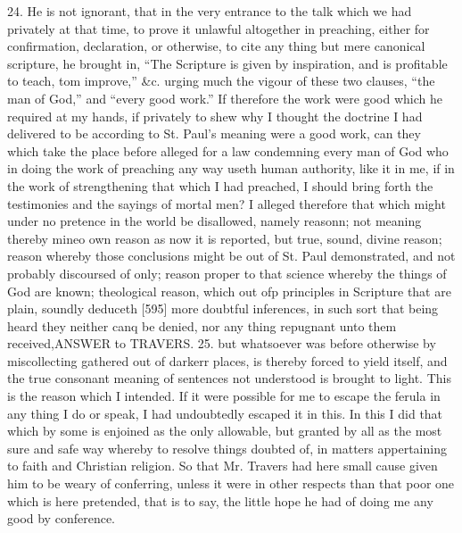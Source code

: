 24. He is not ignorant, that in the very entrance to the talk which we had privately at that time, to prove it unlawful altogether in preaching, either for confirmation, declaration, or otherwise, to cite any thing but mere canonical scripture, he brought in, “The Scripture is given by inspiration, and is profitable to teach, tom improve,” &c. urging much the vigour of these two clauses, “the man of God,” and “every good work.” If therefore the work were good which he required at my hands, if privately to shew why I thought the doctrine I had delivered to be according to St. Paul’s meaning were a good work, can they which take the place before alleged for a law condemning every man of God who in doing the work of preaching any way useth human authority, like it in me, if in the work of strengthening that which I had preached, I should bring forth the testimonies and the sayings of mortal men? I alleged therefore that which might under no pretence in the world be disallowed, namely reasonn; not meaning thereby mineo own reason as now it is reported, but true, sound, divine reason; reason whereby those conclusions might be out of St. Paul demonstrated, and not probably discoursed of only; reason proper to that science whereby the things of God are known; theological reason, which out ofp principles in Scripture that are plain, soundly deduceth [595] more doubtful inferences, in such sort that being heard they neither canq be denied, nor any thing repugnant unto them received,ANSWER to TRAVERS. 25. but whatsoever was before otherwise by miscollecting gathered out of darkerr places, is thereby forced to yield itself, and the true consonant meaning of sentences not understood is brought to light. This is the reason which I intended. If it were possible for me to escape the ferula in any thing I do or speak, I had undoubtedly escaped it in this. In this I did that which by some is enjoined as the only allowable, but granted by all as the most sure and safe way whereby to resolve things doubted of, in matters appertaining to faith and Christian religion. So that Mr. Travers had here small cause given him to be weary of conferring, unless it were in other respects than that poor one which is here pretended, that is to say, the little hope he had of doing me any good by conference.

